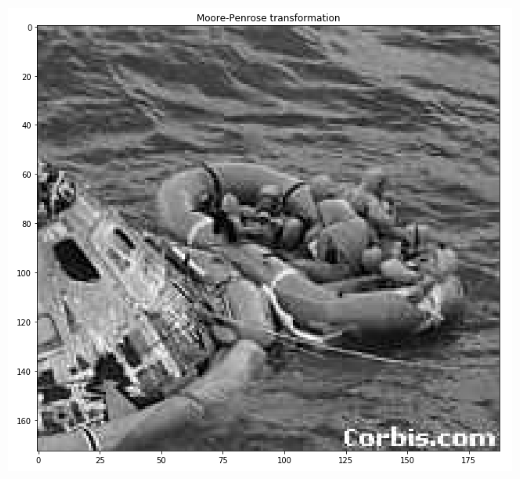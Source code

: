 \documentclass[12pt, a4paper]{article}
\begin{document}
\begin{enumerate}
  \includegraphics[scale=0.39]{Moore_2.png}
\end{enumerate}
\end{document}

